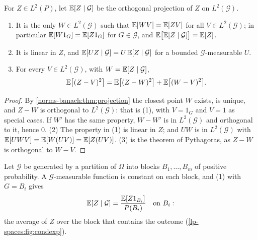 \begin{notechapter}
\begin{theorem}
\label{lp-spaces:thm:condexp}
For $Z\in L^2(P)$, let $\mathbb{E}[Z\mid\mathcal G]$ be the orthogonal
projection of $Z$ on $L^2(\mathcal G)$.
\begin{enumerate}[nosep]
  \item It is the only $W\in L^2(\mathcal G)$ such that
        $\mathbb{E}[WV] = \mathbb{E}[ZV]$ for all $V\in L^2(\mathcal G)$; in particular
        $\mathbb{E}[W1_G] = \mathbb{E}[Z1_G]$ for $G\in\mathcal G$, and
        $\mathbb{E}\bigl[\mathbb{E}[Z\mid\mathcal G]\bigr] = \mathbb{E}[Z]$.
  \item It is linear in $Z$, and
        $\mathbb{E}[UZ\mid\mathcal G] = U\,\mathbb{E}[Z\mid\mathcal G]$ for a bounded
        $\mathcal G$-measurable $U$.
  \item For every $V\in L^2(\mathcal G)$, with
        $W = \mathbb{E}[Z\mid\mathcal G]$,
        \[
          \mathbb{E}\bigl[(Z - V)^2\bigr]
          = \mathbb{E}\bigl[(Z - W)^2\bigr] + \mathbb{E}\bigl[(W - V)^2\bigr] .
        \]
\end{enumerate}
\end{theorem}

\begin{proof}
By \cref{norms-banach:thm:projection} the closest point $W$ exists, is
unique, and $Z - W$ is orthogonal to $L^2(\mathcal G)$: that is (1),
with $V = 1_G$ and $V = 1$ as special cases. If $W'$ has the same
property, $W - W'$ is in $L^2(\mathcal G)$ and orthogonal to it, hence
$0$. (2) The property in (1) is linear in $Z$; and $UW$ is in
$L^2(\mathcal G)$ with $\mathbb{E}[UWV] = \mathbb{E}[W(UV)] = \mathbb{E}[Z(UV)]$. (3) is the
theorem of Pythagoras, as $Z - W$ is orthogonal to $W - V$.
\end{proof}

\begin{example}\label{lp-spaces:ex:blocks}
Let $\mathcal G$ be generated by a partition of $\Omega$ into blocks
$B_1,\dots,B_m$ of positive probability. A $\mathcal G$-measurable
function is constant on each block, and (1) with $G = B_i$ gives
\[
  \mathbb{E}[Z\mid\mathcal G] = \frac{\mathbb{E}[Z1_{B_i}]}{P(B_i)}\quad\text{on }B_i :
\]
the average of $Z$ over the block that contains the outcome
(\cref{lp-spaces:fig:condexp}).
\end{example}


\end{notechapter}
